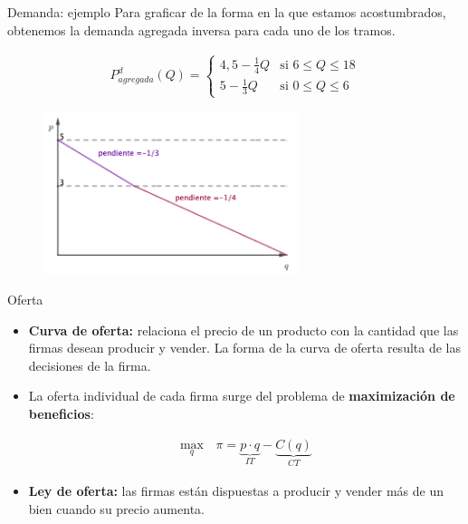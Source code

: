 \documentclass{beamer}
\begin{document}
\begin{frame}{Demanda: ejemplo}
Para graficar de la forma en la que estamos acostumbrados,
obtenemos la demanda agregada inversa para cada uno de los
tramos.

\begin{align*}
    P_{agregada}^{d} (Q)=\begin{cases}
    4,5 - \frac{1}{4}Q & \text{si} \,\, 6 \leq Q \leq 18\\
    5-\frac{1}{3}Q & \text{si} \,\, 0\leq Q\leq 6
    \end{cases}
\end{align*}

\begin{figure}
\includegraphics[width=7.5cm]{figures1/demand_3.png}
\end{figure}
\end{frame}

\begin{frame}{Oferta}
\begin{itemize}
    \item \textbf{Curva de oferta:} relaciona el precio de un producto con la cantidad
    que las firmas desean producir y vender. La forma de la curva de
    oferta resulta de las decisiones de la firma. 
    \item La oferta individual de cada firma surge del problema de \textbf{maximización de beneficios}:
    
    \begin{align*}
        \max_{q} \, &\pi = \underbrace{ p \cdot q}_{IT} - \underbrace{C(q)}_{CT}
    \end{align*}
    
    \item \textbf{Ley de oferta:} las firmas están dispuestas a producir y vender más de un bien cuando su precio aumenta.
\end{itemize}
\end{frame}
\end{document}
